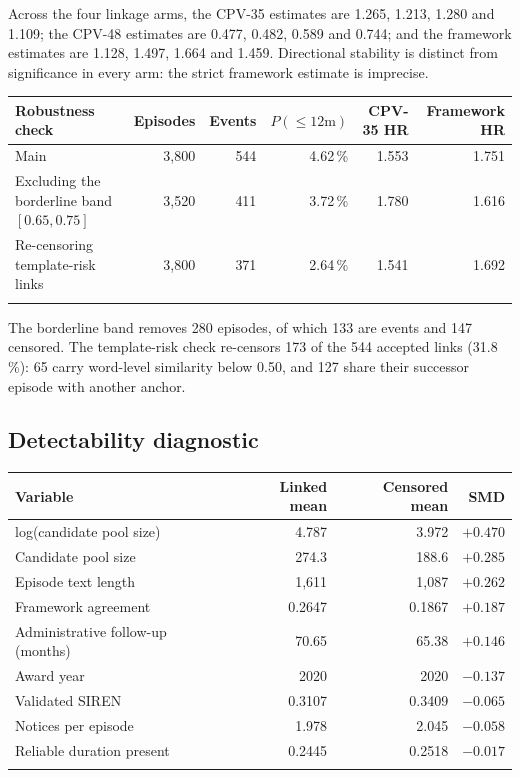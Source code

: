 Across the four linkage arms, the CPV-35 estimates are 1.265, 1.213, 1.280 and 1.109; the CPV-48 estimates
are 0.477, 0.482, 0.589 and 0.744; and the framework estimates are 1.128, 1.497, 1.664 and 1.459. Directional
stability is distinct from significance in every arm: the strict framework estimate is imprecise.

\begingroup
\setlength{\tabcolsep}{4.5pt}
\begin{longtable}[]{@{}>{\raggedright\arraybackslash}p{5.4cm}rrrrr@{}}
\toprule\noalign{}
Robustness check & Episodes & Events & $P(\le 12\text{m})$ & CPV-35 HR & Framework HR \\
\midrule\noalign{}
\endhead
Main & 3,800 & 544 & 4.62\,\% & 1.553 & 1.751 \\
Excluding the borderline band $[0.65,0.75]$ & 3,520 & 411 & 3.72\,\% & 1.780 & 1.616 \\
Re-censoring template-risk links & 3,800 & 371 & 2.64\,\% & 1.541 & 1.692 \\
\bottomrule\noalign{}
\end{longtable}
\endgroup

The borderline band removes 280 episodes, of which 133 are events and 147 censored. The template-risk check
re-censors 173 of the 544 accepted links (31.8\,\%): 65 carry word-level similarity below 0.50, and 127 share
their successor episode with another anchor.

\subsection*{Detectability diagnostic}

\begin{longtable}[]{@{}>{\raggedright\arraybackslash}p{5.6cm}rrr@{}}
\toprule\noalign{}
Variable & Linked mean & Censored mean & SMD \\
\midrule\noalign{}
\endhead
log(candidate pool size) & 4.787 & 3.972 & $+0.470$ \\
Candidate pool size & 274.3 & 188.6 & $+0.285$ \\
Episode text length & 1,611 & 1,087 & $+0.262$ \\
Framework agreement & 0.2647 & 0.1867 & $+0.187$ \\
Administrative follow-up (months) & 70.65 & 65.38 & $+0.146$ \\
Award year & 2020 & 2020 & $-0.137$ \\
Validated SIREN & 0.3107 & 0.3409 & $-0.065$ \\
Notices per episode & 1.978 & 2.045 & $-0.058$ \\
Reliable duration present & 0.2445 & 0.2518 & $-0.017$ \\
\bottomrule\noalign{}
\end{longtable}


